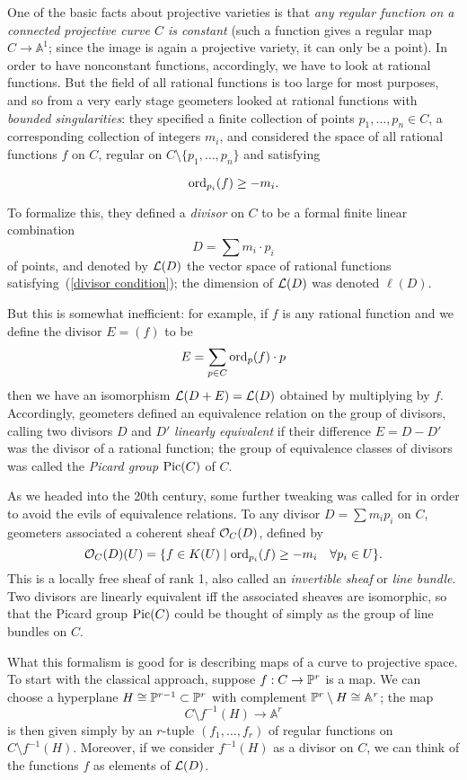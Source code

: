 \documentclass[12pt, leqno]{book}
\def\AA{{\mathbb A}}
\def\cL{{\cal L}}
\begin{document}
One of the basic facts about projective varieties is that \emph{any regular function on a connected projective curve $C$ is constant} (such a function gives a regular map $C \to \AA^1$; since the image is again a projective variety, it can only be a point).  In order to have nonconstant functions, accordingly, we have to look at rational functions. But the field of all rational functions is too large for most purposes, and so from a very early stage geometers looked at rational functions with \emph{bounded singularities}: they specified a finite collection of points $p_1,\dots,p_n \in C$, a corresponding collection of integers $m_i$, and considered the space of all rational functions $f$ on $C$, regular on $C \setminus \{p_1,\dots,p_n\}$  and satisfying

\begin{equation}\label{divisor condition}
\operatorname{ord}_{p_i}(f) \geq -m_i.
\end{equation}

To formalize this, they defined a \emph{divisor} on $C$ to be a formal finite linear combination
$$
D = \sum m_i \cdot p_i
$$
of points, and denoted by $\cL(D)$ the vector space of rational functions satisfying~(\ref{divisor condition}); the dimension of $\cL(D)$ was denoted $\ell(D)$.

But this is somewhat inefficient: for example, if $f$ is any rational function and we define the divisor $E = (f)$ to be
$$
E = \sum_{p\in C} \operatorname{ord}_p(f)\cdot p
$$
then we have an isomorphism $\cL(D+E) = \cL(D)$ obtained by multiplying by $f$. Accordingly, geometers defined an equivalence relation on the group of divisors, calling two divisors $D$ and $D'$ \emph{linearly equivalent} if their difference $E = D - D'$ was the divisor of a rational function; the group of equivalence classes of divisors was called the \emph{Picard group} $\operatorname{Pic}(C)$ of $C$.

As we headed into the 20th century, some further tweaking was called for in order to avoid the evils of equivalence relations. To any divisor $D = \sum m_ip_i$ on $C$, geometers associated a coherent sheaf ${\mathcal O}_C(D)$, defined by
$$
{\mathcal O}_C(D)(U) = \{ f \in K(U) \mid \operatorname{ord}_{p_i}(f) \geq -m_i \quad \forall p_i \in U \}.
$$
This is a locally free sheaf of rank 1, also called an \emph{invertible sheaf} or \emph{line bundle}. Two divisors are linearly equivalent iff the associated sheaves are isomorphic, so that the Picard group $\operatorname{Pic}(C)$ could be thought of simply as the group of line bundles on $C$.

What this formalism is good for is describing maps of a curve to projective space. To start with the classical approach, suppose $f : C \to {\mathbb P}^r$ is a map. We can choose a hyperplane $H \cong {\mathbb P}^{r-1} \subset {\mathbb P}^r$ with complement $\PP^r \setminus H \cong \AA^r$; the map 
$$
C \setminus f^{-1}(H) \to \AA^r
$$
is then given simply by an $r$-tuple $(f_1,\dots,f_r)$ of regular functions on $C \setminus f^{-1}(H)$. Moreover, if we consider $f^{-1}(H)$ as a divisor on $C$, we can think of the functions $f$ as elements of $\cL(D)$.
\end{document}
